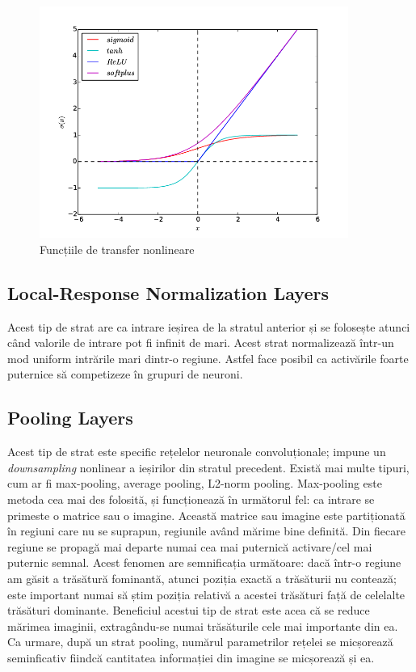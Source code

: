 \begin{figure}[h!]
    	\centering
	\captionsetup{justification=centering, margin=2cm}
	\includegraphics[width=0.9\textwidth]{figures/nonlinear_activation_functions.png}
	\caption{Funcțiile de transfer nonlineare \cite{non_lin_act_fun}}
	\label{fig:set of Gabor filters}
\end{figure}

\subsection{Local-Response Normalization Layers}
Acest tip de strat are ca intrare ieșirea de la stratul anterior și se folosește atunci când valorile de intrare pot fi infinit de mari. Acest strat normalizează într-un mod uniform intrările mari dintr-o regiune. Astfel face posibil ca activările foarte puternice să competizeze în grupuri de neuroni.

\subsection{Pooling Layers}
Acest tip de strat este specific rețelelor neuronale convoluționale; impune un \textit{downsampling} nonlinear a ieșirilor din stratul precedent. Există mai multe tipuri, cum ar fi max-pooling, average pooling, L2-norm pooling.\newline
Max-pooling este metoda cea mai des folosită, și funcționează în următorul fel: ca intrare se primeste o matrice sau o imagine. Această matrice sau imagine este partiționată în regiuni care nu se suprapun, regiunile având mărime bine definită. Din fiecare regiune se propagă mai departe numai cea mai puternică activare/cel mai puternic semnal. Acest fenomen are semnificația următoare: dacă într-o regiune am găsit a trăsătură fominantă, atunci poziția exactă a trăsăturii nu contează; este important numai să știm poziția relativă a acestei trăsături față de celelalte trăsături dominante. Beneficiul acestui tip de strat este acea că se reduce mărimea imaginii, extragându-se numai trăsăturile cele mai importante din ea. Ca urmare, după un strat pooling, numărul parametrilor rețelei se micșorează seminficativ fiindcă cantitatea informației din imagine se micșorează și ea.

